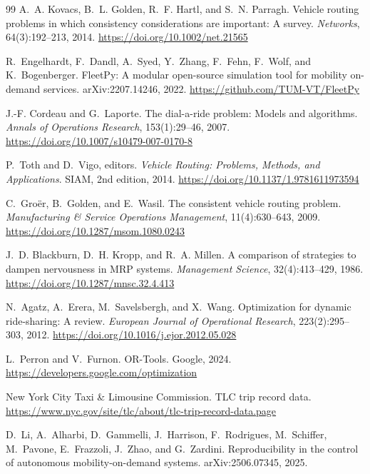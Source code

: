 \begin{thebibliography}{99}
A.~A. Kovacs, B.~L. Golden, R.~F. Hartl, and S.~N. Parragh.
\newblock Vehicle routing problems in which consistency considerations are important: A survey.
\newblock \emph{Networks}, 64(3):192--213, 2014.
\newblock \url{https://doi.org/10.1002/net.21565}

R.~Engelhardt, F.~Dandl, A.~Syed, Y.~Zhang, F.~Fehn, F.~Wolf, and K.~Bogenberger.
\newblock FleetPy: A modular open-source simulation tool for mobility on-demand services.
\newblock arXiv:2207.14246, 2022.
\newblock \url{https://github.com/TUM-VT/FleetPy}

J.-F. Cordeau and G.~Laporte.
\newblock The dial-a-ride problem: Models and algorithms.
\newblock \emph{Annals of Operations Research}, 153(1):29--46, 2007.
\newblock \url{https://doi.org/10.1007/s10479-007-0170-8}

P.~Toth and D.~Vigo, editors.
\newblock \emph{Vehicle Routing: Problems, Methods, and Applications}.
\newblock SIAM, 2nd edition, 2014.
\newblock \url{https://doi.org/10.1137/1.9781611973594}

C.~Groër, B.~Golden, and E.~Wasil.
\newblock The consistent vehicle routing problem.
\newblock \emph{Manufacturing \& Service Operations Management}, 11(4):630--643, 2009.
\newblock \url{https://doi.org/10.1287/msom.1080.0243}

J.~D. Blackburn, D.~H. Kropp, and R.~A. Millen.
\newblock A comparison of strategies to dampen nervousness in MRP systems.
\newblock \emph{Management Science}, 32(4):413--429, 1986.
\newblock \url{https://doi.org/10.1287/mnsc.32.4.413}

N.~Agatz, A.~Erera, M.~Savelsbergh, and X.~Wang.
\newblock Optimization for dynamic ride-sharing: A review.
\newblock \emph{European Journal of Operational Research}, 223(2):295--303, 2012.
\newblock \url{https://doi.org/10.1016/j.ejor.2012.05.028}

L.~Perron and V.~Furnon.
\newblock OR-Tools.
\newblock Google, 2024.
\newblock \url{https://developers.google.com/optimization}

New York City Taxi \& Limousine Commission.
\newblock TLC trip record data.
\newblock \url{https://www.nyc.gov/site/tlc/about/tlc-trip-record-data.page}

D.~Li, A.~Alharbi, D.~Gammelli, J.~Harrison, F.~Rodrigues, M.~Schiffer, M.~Pavone, E.~Frazzoli,
J.~Zhao, and G.~Zardini.
\newblock Reproducibility in the control of autonomous mobility-on-demand systems.
\newblock arXiv:2506.07345, 2025.


\end{thebibliography}
